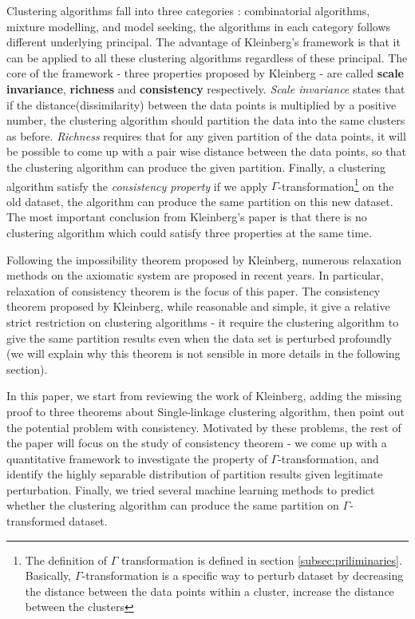 \documentclass{uonmathreport}
\begin{document}
\noindent
Clustering algorithms fall into three categories \cite{esl}: combinatorial algorithms, mixture modelling, and model seeking, the algorithms in each category follows different underlying principal. The advantage of Kleinberg's framework is that it can be applied to all these clustering algorithms regardless of these principal. The core of the framework - three properties proposed by Kleinberg - are called \textbf{scale invariance}, \textbf{richness} and \textbf{consistency} respectively. \textit{Scale invariance} states that if the distance(dissimilarity) between the data points is multiplied by a positive number, the clustering algorithm should partition the data into the same clusters as before. \textit{Richness} requires that for any given partition of the data points, it will be possible to come up with a pair wise distance between the data points, so that the clustering algorithm can produce the given partition. Finally, a clustering algorithm satisfy the \textit{consistency property} if we apply $\Gamma$-transformation\footnote{The definition of $\Gamma$ transformation is defined in section \ref{subsec:priliminaries}. Basically, $\Gamma$-transformation is a specific way to perturb dataset by decreasing the distance between the data points within a cluster, increase the distance between the clusters} on the old dataset, the algorithm can produce the same partition on this new dataset. The most important conclusion from Kleinberg's paper is that there is no clustering algorithm which could satisfy three properties at the same time.

Following the impossibility theorem proposed by Kleinberg, numerous relaxation methods on the axiomatic system are proposed in recent years. In particular, relaxation of consistency theorem is the focus of this paper. The consistency theorem proposed by Kleinberg, while reasonable and simple, it give a relative strict restriction on clustering algorithms - it require the clustering algorithm to give the same partition results even when the data set is perturbed profoundly (we will explain why this theorem is not sensible in more details in the following section). 

In this paper, we start from reviewing the work of Kleinberg, adding the missing proof to three theorems about Single-linkage clustering algorithm, then point out the potential problem with consistency. Motivated by these problems, the rest of the paper will focus on the study of consistency theorem - we come up with a quantitative framework to investigate the property of $\Gamma$-transformation, and identify the highly separable distribution of partition results given legitimate perturbation. Finally, we tried several machine learning methods to predict whether the clustering algorithm can produce the same partition on $\Gamma$-transformed dataset.
\end{document}
